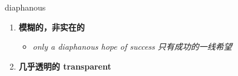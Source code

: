 
\begin{frame}
{\huge diaphanous}
\begin{center}
\begin{enumerate}\Large
  \item \textbf{模糊的，非实在的}
  \begin{itemize}
    \item \em{\Large{only a diaphanous hope of success 只有成功的一线希望}}
  \end{itemize}
  \item \textbf{几乎透明的 transparent}
\end{enumerate}
\end{center}
\end{frame}
